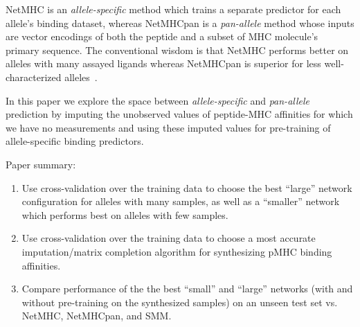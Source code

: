 NetMHC is an {\it allele-specific} method which trains a separate predictor for each allele's binding dataset, whereas NetMHCpan is a {\it pan-allele} method whose inputs are vector encodings of both the peptide and a subset of MHC molecule's primary sequence. The conventional wisdom is that NetMHC performs better on alleles with many assayed ligands whereas NetMHCpan is superior for less well-characterized alleles~\cite{Gfeller_2016}.

In this paper we explore the space between {\it allele-specific} and {\it pan-allele} prediction by imputing the unobserved values of peptide-MHC affinities for which we have no measurements and using these imputed values for pre-training of allele-specific binding predictors.

Paper summary:
\begin{enumerate}
\item Use cross-validation over the training data to choose the best ``large'' network configuration for alleles with many samples, as well as a ``smaller'' network which performs best on alleles with few samples.
\item Use cross-validation over the training data to choose a most accurate imputation/matrix completion algorithm for 
synthesizing pMHC binding affinities.
\item Compare performance of the the best ``small'' and ``large'' networks (with and without pre-training on the synthesized samples) on an unseen test set vs. NetMHC, NetMHCpan, and SMM. 
\end{enumerate}